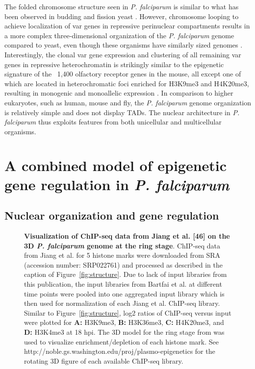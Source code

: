 The folded chromosome structure seen in \textit{P. falciparum} is similar to what has
been observed in budding and fission yeast \citep{duan:three,
tanizawa:mapping}. However, chromosome
looping to achieve localization of var genes in repressive perinuclear
compartments results in a more complex three-dimensional organization of the
\textit{P. falciparum} genome compared to yeast, even though these organisms have
similarly sized genomes \citep{ay:three-dimensional}.
Interestingly, the clonal var gene expression
and clustering of all remaining var genes in repressive heterochromatin is
strikingly similar to the epigenetic signature of the ~1,400 olfactory
receptor genes in the mouse, all except one of which are located in
heterochromatic foci enriched for H3K9me3 and H4K20me3, resulting in monogenic
and monoallelic expression \citep{magklara:epigenetic, lyons:epigenetic}.
In comparison to higher eukaryotes, such
as human, mouse and fly, the \textit{P. falciparum} genome organization is relatively
simple and does not display TADs. The nuclear architecture in \textit{P.
falciparum}
thus exploits features from both unicellular and multicellular organisms.

\section{A combined model of epigenetic gene regulation in \textit{P.
falciparum}}

\subsection{Nuclear organization and gene regulation}

\begin{figure}
\begin{center}
\end{center}
\caption{\textbf{Visualization of ChIP-seq data from Jiang et al. [46] on the
3D {\em P.
 falciparum} genome at the ring stage}.
 ChIP-seq data from Jiang et al. for 5 histone marks were downloaded from SRA
 (accession number: SRP022761) and processed as described in the caption of
 Figure~\ref{fig:structure}. Due to lack of input libraries from this publication, the input
 libraries from Bartfai et al. at different time points were pooled into one
 aggregated input library which is then used for normalization of each Jiang
 et al. ChIP-seq library. Similar to Figure~\ref{fig:structure}, log2 ratios of ChIP-seq versus
 input were plotted for \textbf{A:} H3K9me3, \textbf{B:} H3K36me3, \textbf{C:}
 H4K20me3, and \textbf{D:} H3K4me3
 at 18 hpi. The 3D model for the ring stage from \citep{ay:three-dimensional} was used to
 visualize enrichment/depletion of each histone mark. See
 http://noble.gs.washington.edu/proj/plasmo-epigenetics for the rotating 3D
 figure of each available ChIP-seq library.
}
\label{fig:histone}
\end{figure}

